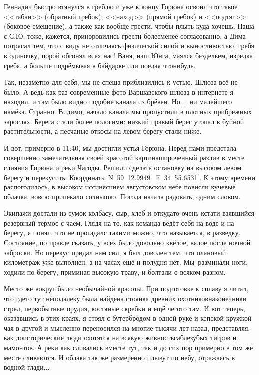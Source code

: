Геннадич быстро втянулся в греблю и уже к концу Горюна освоил что такое <<табан>> (обратный гребок), <<наход>> (прямой гребок) и <<подтяг>> (боковое смещение), а также как вообще грести, чтобы плыть куда хочешь. Паша с С.Ю. тоже, кажется, приноровились грести более\sdash менее согласованно, а Дима потрясал тем, что с виду не отличаясь физической силой и выносливостью, гребя в одиночку, порой обгонял всех нас! Ваня, наш Юнга, маялся бездельем, изредка гребя, а больше подрёмывая в байдарке или поедая что\sdash нибудь. 

Так, незаметно для себя, мы не спеша приблизились к устью. Шлюза всё не было. А ведь как раз современные фото Варшавского шлюза в интернете я находил, и там было видно подобие канала из брёвен. Но$\ldots$~ни малейшего намёка. Странно. Видимо, начало канала мы пропустили в плотных прибрежных зарослях. Берега стали более пологими: низкий правый берег утопал в буйной растительности, а песчаные откосы на левом берегу стали ниже. 

И вот, примерно в 11:40, мы достигли устья Горюна. Перед нами предстала совершенно замечательная своей красотой картина\mdash широченный разлив в месте слияния Горюна и реки Чагоды. Решили сделать остановку на высоком левом берегу и перекусить. Координаты N~59\degree~12.9949$^\prime$~E~34\degree~55.6531$^\prime$. К этому времени распогодилось, в высоком иссиня\sdash синем августовском небе повисли кучевые облачка, вовсю припекало солнышко. Погода начала радовать, одним словом. 

Экипажи достали из сумок колбасу, сыр, хлеб и откуда\sdash то очень кстати взявшийся резервный термос с чаем. Глядя на то, как команда ведёт себя на воде и на берегу, я понял, что не прогадал\mdash с такими можно, что называется, в разведку. Состояние, по правде сказать, у всех было довольно квёлое, вялое после ночной заброски. Но перекус придал нам сил, я был доволен тем, что плановый километраж уже выполнен, а на часах ещё и полудня нет. Мы~разминали ноги, ходили по берегу, приминая высокую траву, и болтали о всяком разном.

Место же вокруг было необычайной красоты. При подготовке к сплаву я читал, что где\sdash то тут неподалеку была найдена стоянка древних охотников\mdash наконечники стрел, первобытные орудия, костяные скребки и ещё чего\sdash то там. И вот теперь, оказавшись в этих краях, я стоял с бутербродом в одной руке и кэпской кружкой чая в другой и мысленно переносился на многие тысячи лет назад, представляя, как доисторические люди охотятся на всякую живность\mdash саблезубых тигров и мамонтов. А реки как сливались вместе тут, так и до сих пор примерно в том же месте сливаются. И облака так же размеренно плывут по небу, отражаясь в водной глади$\ldots$

